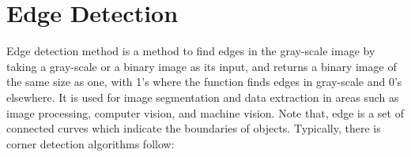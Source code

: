 
\section{Edge Detection}
Edge detection method is a method to find edges in the gray-scale image by taking a gray-scale or a binary image as its input, and returns a binary image of the same size as one, with 1's where the function finds edges in gray-scale and 0's elsewhere. It is used for image segmentation and data extraction in areas such as image processing, computer vision, and machine vision. Note that, edge is a set of connected curves which indicate the boundaries of objects. Typically, there is corner detection algorithms follow:
